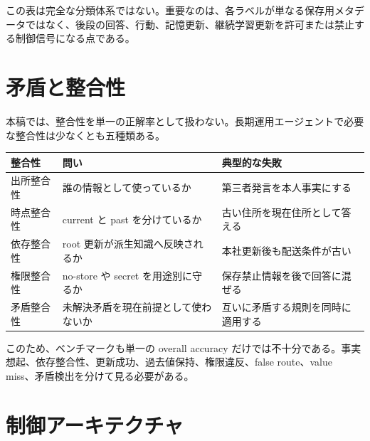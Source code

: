 \documentclass[12pt,a4paper]{article}
\begin{document}
この表は完全な分類体系ではない。重要なのは、各ラベルが単なる保存用メタデータではなく、後段の回答、行動、記憶更新、継続学習更新を許可または禁止する制御信号になる点である。

\section{矛盾と整合性}\label{ux77dbux76feux3068ux6574ux5408ux6027}

本稿では、整合性を単一の正解率として扱わない。長期運用エージェントで必要な整合性は少なくとも五種類ある。

{\def\LTcaptype{table} %
\begin{longtable}[]{@{}
  >{\raggedright\arraybackslash}p{}
  >{\raggedright\arraybackslash}p{}
  >{\raggedright\arraybackslash}p{}@{}}
\toprule\noalign{}
\begin{minipage}[b]{\linewidth}\raggedright
整合性
\end{minipage} & \begin{minipage}[b]{\linewidth}\raggedright
問い
\end{minipage} & \begin{minipage}[b]{\linewidth}\raggedright
典型的な失敗
\end{minipage} \\
\midrule\noalign{}
\endhead
\bottomrule\noalign{}
\endlastfoot
出所整合性 & 誰の情報として使っているか & 第三者発言を本人事実にする \\
時点整合性 & current と past を分けているか & 古い住所を現在住所として答える \\
依存整合性 & root 更新が派生知識へ反映されるか & 本社更新後も配送条件が古い \\
権限整合性 & no-store や secret を用途別に守るか & 保存禁止情報を後で回答に混ぜる \\
矛盾整合性 & 未解決矛盾を現在前提として使わないか & 互いに矛盾する規則を同時に適用する \\
\end{longtable}
}

このため、ベンチマークも単一の overall accuracy だけでは不十分である。事実想起、依存整合性、更新成功、過去値保持、権限違反、false route、value miss、矛盾検出を分けて見る必要がある。

\section{制御アーキテクチャ}\label{ux5236ux5fa1ux30a2ux30fcux30adux30c6ux30afux30c1ux30e3}
\end{document}
